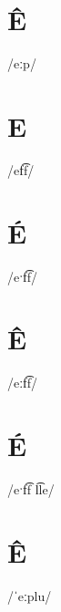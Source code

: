 \documentclass[10pt,a4paper,twoside]{book}
\begin{document}
\section*{Ê}

\begin{multicols}{3}
 {/eːp/} {}
\end{multicols}

\section*{E}

\begin{multicols}{3}
 {/ef͡f/} {}
\end{multicols}

\section*{É}

\begin{multicols}{3}
 {/eˑf͡f/} {}
\end{multicols}

\section*{Ê}

\begin{multicols}{3}
 {/eːf͡f/} {}
\end{multicols}

\section*{É}

\begin{multicols}{3}
 {/eˑf͡f l͡le/} {}
\end{multicols}

\section*{Ê}

\begin{multicols}{3}
 {/ˈeːplu/} {}
\end{multicols}
\end{document}
